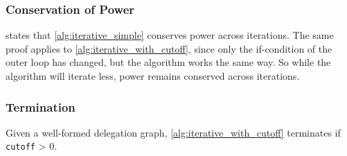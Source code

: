 \subsubsection{Conservation of Power}

 states that \cref{alg:iterative_simple} conserves power across iterations. The same proof applies to \cref{alg:iterative_with_cutoff}, since only the if-condition of the outer loop has changed, but the algorithm works the same way. So while the algorithm will iterate less, power remains conserved across iterations.

\subsubsection{Termination}

\begin{lemma}\label{lem:iterative_alg_power_concentrates}
Given a well-formed delegation graph, \cref{alg:iterative_with_cutoff} terminates if \texttt{cutoff} > 0.
\end{lemma}


